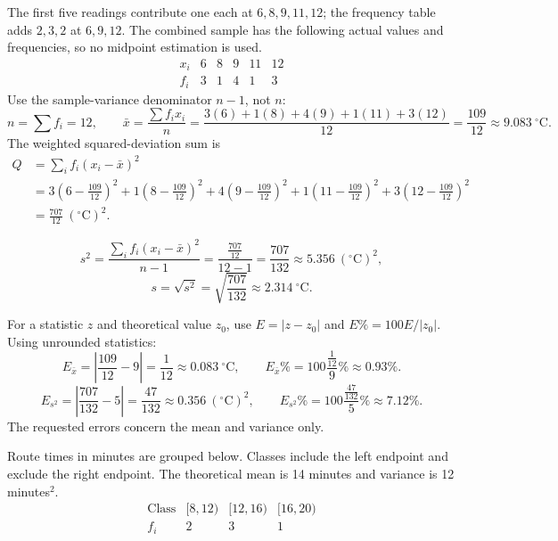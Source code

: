 
The first five readings contribute one each at $6,8,9,11,12$; the frequency table adds $2,3,2$ at $6,9,12$. The combined sample has the following actual values and frequencies, so no midpoint estimation is used.\[\begin{array}{c|rrrrr}x_i&6&8&9&11&12\\\hline f_i&3&1&4&1&3\end{array}\]
Use the sample-variance denominator $n-1$, not $n$:
\[n=\sum f_i=12,\qquad\bar x=\frac{\sum f_ix_i}{n}=\frac{3(6)+1(8)+4(9)+1(11)+3(12)}{12}=\frac{109}{12}\approx9.083\ {}^\circ\mathrm C.\]
The weighted squared-deviation sum is
\[\begin{aligned}Q&=\sum_i f_i(x_i-\bar x)^2\\&=3\left(6-\frac{109}{12}\right)^2+1\left(8-\frac{109}{12}\right)^2+4\left(9-\frac{109}{12}\right)^2+1\left(11-\frac{109}{12}\right)^2+3\left(12-\frac{109}{12}\right)^2\\&=\frac{707}{12}\ ({}^\circ\mathrm C)^2.\end{aligned}\]
\begin{samepage}\[s^2=\frac{\sum_i f_i(x_i-\bar x)^2}{n-1}=\frac{\frac{707}{12}}{12-1}=\frac{707}{132}\approx5.356\ ({}^\circ\mathrm C)^2,\]
\[s=\sqrt{s^2}=\sqrt{\frac{707}{132}}\approx2.314\ {}^\circ\mathrm C.\]\end{samepage}


For a statistic $z$ and theoretical value $z_0$, use $E=|z-z_0|$ and $E\%=100E/|z_0|$.
Using unrounded statistics:
\[E_{\bar x}=\left|\frac{109}{12}-9\right|=\frac{1}{12}\approx0.083\ {}^\circ\mathrm C,\qquad
E_{\bar x}\%=100\frac{\frac{1}{12}}{9}\%\approx0.93\%.\]
\[E_{s^2}=\left|\frac{707}{132}-5\right|=\frac{47}{132}\approx0.356\ ({}^\circ\mathrm C)^2,\qquad
E_{s^2}\%=100\frac{\frac{47}{132}}{5}\%\approx7.12\%.\]
The requested errors concern the mean and variance only.

Route times in minutes are grouped below. Classes include the left endpoint and exclude the right endpoint. The theoretical mean is 14 minutes and variance is 12 minutes$^2$.
\[
\begin{array}{c|rrr}
\text{Class}&[8,12)&[12,16)&[16,20)\\\hline
f_i&2&3&1
\end{array}
\]

